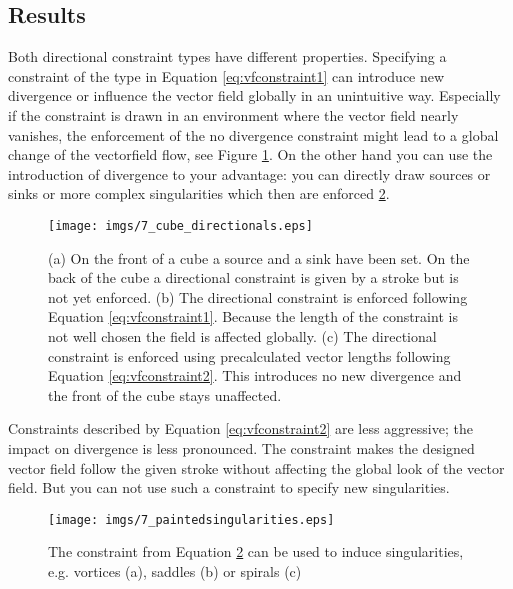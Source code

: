\subsection{Results}

Both directional constraint types have different properties. Specifying a constraint of the type in Equation \ref{eq:vfconstraint1} can introduce new divergence or influence the vector field globally in an unintuitive way. Especially if the constraint is drawn in an environment where the vector field nearly vanishes, the enforcement of the no divergence constraint might lead to a global change of the vectorfield flow, see Figure \ref{fig:vf_dirconstr}. On the other hand you can use the introduction of divergence to your advantage: you can directly draw sources or sinks or more complex singularities which then are enforced \ref{fig:7_paintedSing}.

\begin{figure}%
\begin{center}
\texttt{[image: imgs/7\_cube\_directionals.eps]}%
\end{center}
\vspace{-15pt}
\caption{(a) On the front of a cube a source and a sink have been set. On the back of the cube a directional constraint is given by a stroke but is not yet enforced. (b) The directional constraint is enforced following Equation \ref{eq:vfconstraint1}. Because the length of the constraint is not well chosen the field is affected globally.
(c) The directional constraint is enforced using precalculated vector lengths following Equation \ref{eq:vfconstraint2}. This introduces no new divergence and the front of the cube stays unaffected. }%
\label{fig:vf_dirconstr}%
\end{figure}


Constraints described by Equation \ref{eq:vfconstraint2} are less aggressive; the impact on divergence is less pronounced. The constraint makes the designed vector field  follow the given stroke without affecting the global look of the vector field. But you can not use such a constraint to specify new singularities.

\begin{figure}%
\texttt{[image: imgs/7\_paintedsingularities.eps]}%
\caption{The constraint from Equation \ref{fig:7_paintedSing} can be used to induce singularities, e.g. vortices (a), saddles (b) or spirals (c)}%
\label{fig:7_paintedSing}%
\end{figure}

